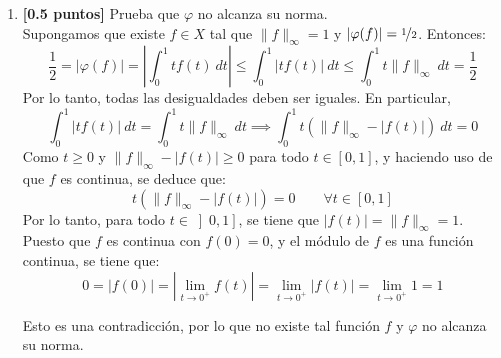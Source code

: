 \documentclass[12pt]{article}
\begin{document}
\begin{ejercicio}[1.5 puntos]
\begin{enumerate}[label=\alph*)]
            Se verifica que $\|f_n\|_\infty = 1$ para todo $n$. Además, se tiene:
            \begin{align*}
                \varphi(f_n) &= \int_0^{\nicefrac{1}{n}} t(nt)~dt + \int_{\nicefrac{1}{n}}^1 t(1)~dt = \int_0^{\nicefrac{1}{n}} n t^2~dt + \int_{\nicefrac{1}{n}}^1 t~dt = n\left[\frac{t^3}{3}\right]_0^{\nicefrac{1}{n}} + \left[\frac{t^2}{2}\right]_{\nicefrac{1}{n}}^1 =\\&= \frac{1}{3n^2} + \left(\frac{1}{2} - \frac{1}{2n^2}\right) = \frac{1}{2} - \frac{1}{6n^2}.
            \end{align*}

            Por lo tanto:
            \begin{equation*}
                \|\varphi\| \geq \dfrac{|\varphi(f_n)|}{\|f_n\|_\infty} = \frac{1}{2} - \frac{1}{6n^2}\qquad \forall n\geq 2
            \end{equation*}
            Tomando el límite cuando $n\to\infty$, obtenemos que $\|\varphi\| \geq \nicefrac{1}{2}$. Combinando esto con la desigualdad anterior, concluimos que $\|\varphi\| = \nicefrac{1}{2}$.
            \item \textbf{[0.5 puntos]} Prueba que $\varphi$ no alcanza su norma.\\
            
            Supongamos que existe $f\in X$ tal que $\|f\|_\infty = 1$ y $|\varphi(f)| = \nicefrac{1}{2}$. Entonces:
            \begin{equation*}
                \frac{1}{2} = |\varphi(f)| = \left|\int_0^1 tf(t)~dt\right| \leq \int_0^1 |tf(t)|~dt \leq \int_0^1 t\|f\|_\infty~dt = \frac{1}{2}
            \end{equation*}
            Por lo tanto, todas las desigualdades deben ser iguales. En particular,
            \begin{equation*}
                \int_0^1 |tf(t)|~dt = \int_0^1 t\|f\|_\infty~dt \implies \int_0^1 t\left(\|f\|_\infty - |f(t)|\right)~dt = 0
            \end{equation*}
            Como $t\geq 0$ y $\|f\|_\infty - |f(t)| \geq 0$ para todo $t\in [0,1]$, y haciendo uso de que $f$ es continua, se deduce que:
            \begin{equation*}
                t\left(\|f\|_\infty - |f(t)|\right) = 0 \qquad \forall t\in [0,1]
            \end{equation*}
            Por lo tanto, para todo $t\in \left]0,1\right]$, se tiene que $|f(t)| = \|f\|_\infty = 1$. Puesto que $f$ es continua con $f(0) = 0$, y el módulo de $f$ es una función continua, se tiene que:
            \begin{equation*}
                0 = |f(0)| = \left|\lim_{t\to 0^+} f(t)\right| = \lim_{t\to 0^+} |f(t)| = \lim_{t\to 0^+} 1 = 1
            \end{equation*}

            Esto es una contradicción, por lo que no existe tal función $f$ y $\varphi$ no alcanza su norma.
        \end{enumerate}
    \end{ejercicio}
\end{document}
